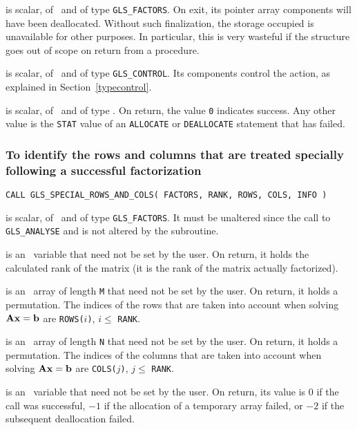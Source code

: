 \documentclass{galahad}
\newcommand{\packagename}{GLS}
\begin{document}
\vspace*{-1mm}
\begin{description}

 is scalar, of \intentinout\ and of type
{\tt \packagename\_FACTORS}. On exit, its pointer array components will have
been deallocated.  Without such finalization, the storage occupied is
unavailable for other purposes. In particular, this is very wasteful
if the structure goes out of scope on return from a procedure.

 is scalar, of \intentin\ and of type {\tt \packagename\_CONTROL}.
Its components control the action, as explained in
Section~\ref{typecontrol}.

 is scalar, of \intentout\ and of type \integer.  On return,
the value {\tt 0} indicates success. Any other value is the {\tt STAT} value of
an {\tt ALLOCATE} or {\tt DEALLOCATE} statement that has failed.

\end{description}


\subsubsection{ To identify the rows and columns that are treated specially
         following a successful factorization}

\hspace{8mm}
{\tt CALL \packagename\_SPECIAL\_ROWS\_AND\_COLS( FACTORS, RANK, ROWS, COLS,
INFO )}

\begin{description}

 is scalar, of \intentin\ and of type {\tt \packagename\_FACTORS}.
It must be unaltered since the call to {\tt \packagename\_ANALYSE} and is
not altered by the subroutine.

 is an \integer\ variable that need not be set by the user. On
return, it holds the calculated rank of the matrix (it is the rank of the
matrix actually factorized).

 is an \integer\ array of length {\tt M} that need not be set by the
user. On return, it holds a permutation. The indices of the rows that
are taken into account when solving ${\mathbf{A}} {\mathbf{x}} = {\mathbf{b}}$
are {\tt ROWS(}$i${\tt )}, $i \leq$ {\tt RANK}.

 is an \integer\ array of length {\tt N} that need not be set by the
user. On return, it holds a permutation. The indices of the columns that
are taken into account when solving ${\mathbf{A}} {\mathbf{x}} = {\mathbf{b}}$
are {\tt COLS(}$j${\tt )}, $j \leq$ {\tt RANK}.

 is an \integer\ variable that need not be set by the user. On
return, its value is $0$ if the call was successful, $-1$ if the allocation
of a temporary array failed, or $-2$ if the subsequent deallocation
failed.

\end{description}
\end{document}
